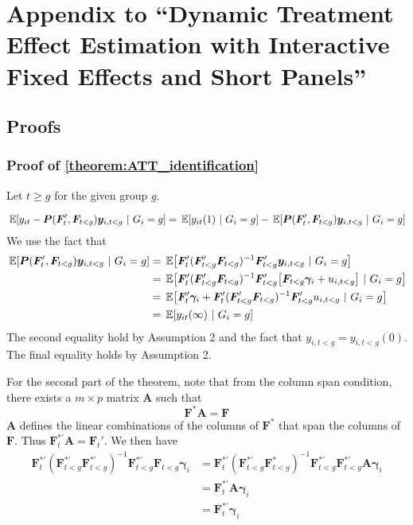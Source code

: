 \chapter{Appendix to ``Dynamic Treatment Effect Estimation with Interactive Fixed Effects and Short Panels''}


\section{Proofs}\label{sec:generalized-proofs}



\subsection{Proof of \autoref{theorem:ATT_identification}}

Let $t \geq g$ for the given group $g$.

\begin{equation*}
    \expec{y_{it} - \bm P(\bm{F}_{t}', \bm{F}_{t < g}) \bm y_{i,t < g}}{G_i = g} = \expec{y_{it}(1)}{G_i = g} - \expec{\bm P(\bm{F}_{t}', \bm{F}_{t < g}) \bm y_{i,t < g}}{G_i = g} 
\end{equation*}
We use the fact that 
\begin{align*}
    \expec{ \bm P(\bm{F}_{t}', \bm{F}_{t < g}) \bm y_{i,t < g} }{G_i = g} 
    &= \expec{ \bm{F}_{t}' (\bm{F}_{t < g}' \bm{F}_{t < g})^{-1} \bm{F}_{t < g}' \bm y_{i,t < g} }{G_i = g} \\
    &= \expec{ \bm{F}_{t}' (\bm{F}_{t < g}' \bm{F}_{t < g})^{-1} \bm{F}_{t < g}' \big[\bm{F}_{t < g} \bm \gamma_i + u_{i,t < g} \big] }{G_i = g} \\
    &= \expec{ \bm{F}_{t}' \bm \gamma_i + \bm{F}_{t}' (\bm{F}_{t < g}' \bm{F}_{t < g})^{-1} \bm{F}_{t < g}' u_{i,t < g} }{G_i = g} \\
    &= \expec{ y_{it}(\infty) }{G_i = g} 
\end{align*}
The second equality hold by Assumption 2 and the fact that $y_{i,t < g} = y_{i, t < g}(0)$. The final equality holds by Assumption 2.

For the second part of the theorem, note that from the column span condition, there exists a $m \times p$ matrix $\bm A$ such that 
\begin{equation}
    \bm{F}^*\bm A = \bm{F}
\end{equation}
$\bm A$ defines the linear combinations of the columns of $\bm{F}^*$ that span the columns of $\bm{F}$. Thus $\bm{F}_t^{*'} \bm A = \bm{F}_t'$. We then have
\begin{align*}
    \bm{F}^{*'}_t (\bm{F}^{*'}_{t < g} \bm{F}^{*'}_{t < g})^{-1} \bm{F}^{*'}_{t < g} \bm{F}_{t < g} \bm \gamma_i
    &= \bm{F}^{*'}_t (\bm{F}^{*'}_{t < g} \bm{F}^{*}_{t < g})^{-1} \bm{F}^{*'}_{t < g} \bm{F}^{*'}_{t < g} \bm A \bm \gamma_i \\
    &= \bm{F}^{*'}_t \bm A \bm \gamma_i \\
    &= \bm{F}^{*'}_t \bm \gamma_i
\end{align*}

